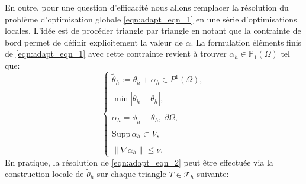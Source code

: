 En outre, pour une question d’efficacité nous allons remplacer la résolution du problème d’optimisation globale \eqref{eqn:adapt_eqn_1} en une série d’optimisations locales. L’idée est de procéder triangle par triangle en notant que la contrainte de bord permet de définir explicitement la valeur de $\alpha$. La formulation éléments finis de \eqref{eqn:adapt_eqn_1} avec cette contrainte revient à trouver $\alpha_h\in\mathbb{P}_1(\Omega)$ tel que:
\begin{equation}
\begin{cases}
\tilde{\theta}_h := \theta_h + \alpha_h \in P^1(\Omega), \\\\
\min \left|\theta_h - \tilde{\theta}_h\right|, \\\\
\alpha_h = \phi_h - \theta_h, \ \partial\Omega, \\\\
\text{Supp}\,\alpha_h \subset V, \\\\
\|\nabla\alpha_h\| \leq \nu.
\end{cases}
\label{eqn:adapt_eqn_2}
\end{equation}
En pratique, la résolution de \eqref{eqn:adapt_eqn_2} peut être effectuée via la construction locale de $\tilde{\theta}_h$ sur chaque triangle $T\in\mathcal{T}_h$ suivante:\\
